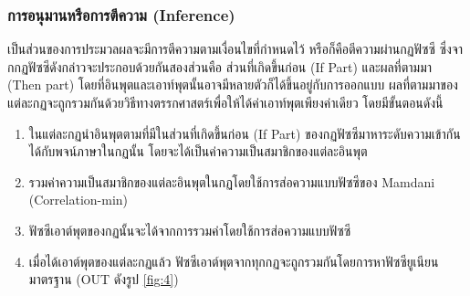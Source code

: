 \subsubsection{การอนุมานหรือการตีความ (Inference)}
เป็นส่วนของการประมวลผลจะมีการตีความตามเงื่อนไขที่กำหนดไว้ หรือก็คือตีความผ่านกฏฟัซซี ซึ่งจากกฏฟัซซีดังกล่าวจะประกอบด้วยกันสองส่วนคือ ส่วนที่เกิดขึ้นก่อน (If Part) และผลที่ตามมา (Then part) โดยที่อินพุตและเอาท์พุตนั้นอาจมีหลายตัวก็ได้ขึ้นอยู่กับการออกแบบ ผลที่ตามมาของแต่ละกฏจะถูกรวมกันด้วยวิธีทางตรรกศาสตร์เพื่อให้ได้ค่าเอาท์พุตเพียงค่าเดียว \cite{Sansanee}
โดยมีขั้นตอนดังนี้
\begin{enumerate}
  \overfullrule=0pt
  \item ในแต่ละกฏนำอินพุตตามที่มีในส่วนที่เกิดขึ้นก่อน (If Part) ของกฏฟัซซีมาหาระดับความเข้ากันได้กับพจน์ภาษาในกฏนั้น โดยจะได้เป็นค่าความเป็นสมาชิกของแต่ละอินพุต
  \item รวมค่าความเป็นสมาชิกของแต่ละอินพุตในกฏโดยใช้การส่อความแบบฟัซซีของ Mamdani (Correlation-min)
  \item ฟัซซีเอาต์พุตของกฏนั้นจะได้จากการรวมค่าโดยใช้การส่อความแบบฟัซซี
  \item เมื่อได้เอาต์พุตของแต่ละกฏแล้ว ฟัซซีเอาต์พุตจากทุกกฏจะถูกรวมกันโดยการหาฟัซซียูเนียนมาตรฐาน (OUT ดังรูป \ref{fig:4})
\end{enumerate}
